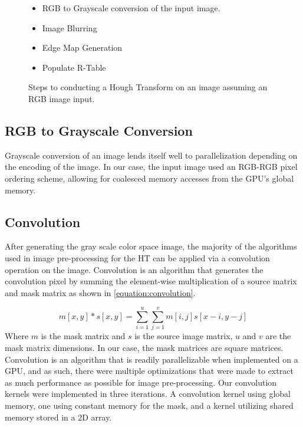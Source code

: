 \documentclass[conference]{IEEEtran}
\begin{document}
\begin{figure}[h]
  \begin{itemize}
    \item RGB to Grayscale conversion of the input image.
    \item Image Blurring 
    \item Edge Map Generation
    \item Populate R-Table
  \end{itemize}\caption{Steps to conducting a Hough Transform on an image assuming an RGB image input.}\label{figure:hough-transform-steps}
\end{figure}



\subsection{RGB to Grayscale Conversion}
Grayscale conversion of an image lends itself well to parallelization depending on the encoding of the image.
In our case, the input image used an RGB-RGB pixel ordering scheme, allowing for coalesced memory accesses from the GPU's global memory.



\subsection{Convolution}
After generating the gray scale color space image, the majority of the algorithms used in image pre-processing for the HT can be applied via a convolution operation on the image.
Convolution is an algorithm that generates the convolution pixel by summing the element-wise multiplication of a source matrix and mask matrix as shown in \autoref{equation:convolution}.

\begin{equation}
  m[x,y] * s[x,y] = \sum\limits_{i = 1}^{u} \sum\limits_{j = 1}^{v} m[i,j]s[x-i, y-j]
  \label{equation:convolution}
\end{equation}
Where $m$ is the mask matrix and $s$ is the source image matrix, $u$ and $v$ are the mask matrix dimensions. In our case, the mask matrices are square matrices.
Convolution is an algorithm that is readily parallelizable when implemented on a GPU, and as such, there were multiple optimizations that were made to extract as much performance as possible for image pre-processing.
Our convolution kernels were implemented in three iterations. 
A convolution kernel using global memory, one using constant memory for the mask, and a kernel utilizing shared memory stored in a 2D array.
\end{document}
